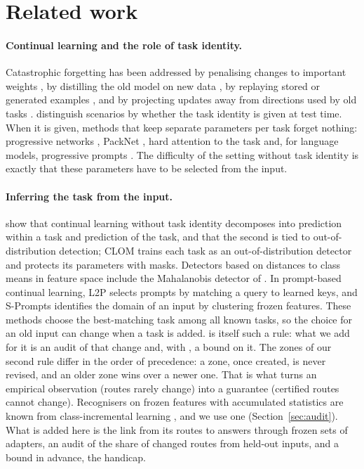 \section{Related work}
\label{sec:related}

\paragraph{Continual learning and the role of task identity.} Catastrophic forgetting has been
addressed by penalising changes to important weights \citep{kirkpatrick2017ewc}, by distilling the
old model on new data \citep{li2016lwf}, by replaying stored or generated examples
\citep{shin2017dgr}, and by projecting updates away from directions used by old tasks
\citep{saha2021gpm}. \citet{vandeven2019three} distinguish scenarios by whether the task identity is
given at test time. When it is given, methods that keep separate parameters per task forget
nothing: progressive networks \citep{rusu2016progressive}, PackNet \citep{mallya2018packnet}, hard
attention to the task \citep{serra2018hat} and, for language models, progressive prompts
\citep{razdaibiedina2023progressive}. The difficulty of the setting without task identity is
exactly that these parameters have to be selected from the input.

\paragraph{Inferring the task from the input.} \citet{kim2022theoretical} show that continual
learning without task identity decomposes into prediction within a task and prediction of the
task, and that the second is tied to out-of-distribution detection; CLOM \citep{kim2022clom} trains
each task as an out-of-distribution detector and protects its parameters with masks. Detectors
based on distances to class means in feature space include the Mahalanobis detector of \citet{lee2018mahalanobis}. In
prompt-based continual learning, L2P \citep{wang2022l2p} selects prompts by matching a query to
learned keys, and S-Prompts \citep{wang2022sprompts} identifies the domain of an input by clustering
frozen features. These methods choose the best-matching task among all known tasks, so the choice
for an old input can change when a task is added. \recog{} is itself such a rule: what we add for
it is an audit of that change and, with \handicap{}, a bound on it. The zones of our second rule differ in the order of
precedence: a zone, once created, is never revised, and an older zone wins over a newer one. That is what turns
an empirical observation (routes rarely change) into a guarantee (certified routes cannot change).
Recognisers on frozen features with accumulated statistics are known from class-incremental learning
\citep{mcdonnell2023ranpac,zhuang2022acil}, and we use one (Section~\ref{sec:audit}). What is added
here is the link from its routes to answers through frozen sets of adapters, an audit of the share of
changed routes from held-out inputs, and a bound in advance, the handicap.

